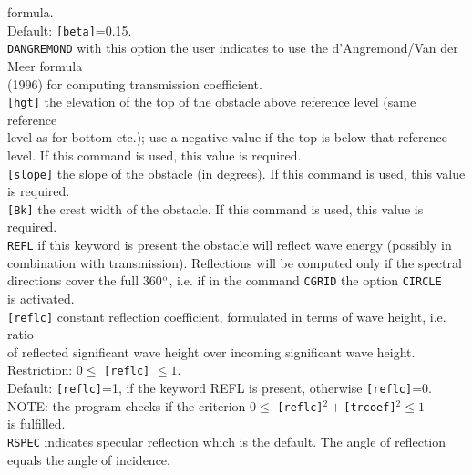 \documentclass[12pt]{book}
\begin{document}
\begin{tabbing}
                    formula.\\
                    Default: {\tt [beta]}=0.15.\-\\
{\tt DANGREMOND} \> with this option the user indicates to use the d'Angremond/Van der Meer formula\+\\
                    (1996) for computing transmission coefficient.\-\\
{\tt [hgt]}      \> the elevation of the top of the obstacle above reference level (same reference\+\\
                    level as for bottom etc.); use a negative value if the top is below that reference\\
                    level. If this command is used, this value is required.\-\\
{\tt [slope]}    \> the slope of the obstacle (in degrees). If this command is used, this value is required.\\
{\tt [Bk]}       \> the crest width of the obstacle. If this command is used, this value is required.\\
{\tt REFL}       \> if this keyword is present the obstacle will reflect wave energy (possibly in\+\\
                    combination with transmission). Reflections will be computed only if the spectral\\
                    directions cover the full 360$^{\rm o}$, i.e. if in the command {\tt CGRID} the option {\tt CIRCLE}\\
                    is activated.\-\\
{\tt [reflc]}    \> constant reflection coefficient, formulated in terms of wave height, i.e. ratio\+\\
                    of reflected significant wave height over incoming significant wave height.\\
                    Restriction: $0 \leq$ {\tt [reflc]} $\leq 1$.\\
                    Default: {\tt [reflc]}=1, if the keyword REFL is present, otherwise {\tt [reflc]}=0.\\
                    NOTE: the program checks if the criterion $0 \leq$ {\tt [reflc]}$^2 + ${\tt [trcoef]}$^2 \leq 1$\\
                    is fulfilled.\-\\
{\tt RSPEC}      \> indicates specular reflection which is the default. The angle of reflection\+\\
                    equals the angle of incidence.\-\\

\end{tabbing}
\end{document}
